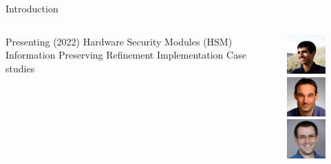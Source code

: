 \placelogofalse
\begin{frame}{Introduction}
\begin{columns}
\centering
\begin{outline}
  \1 Presenting \cite{Athalye2022Verifying} (2022)
  \1 Hardware Security Modules (HSM)
  \1 Information Preserving Refinement
  \1 Implementation
  \1 Case studies
\end{outline}

\begin{center}
\centering
{}

\includegraphics[width=1.5cm]{author_athalye.jpg} 
\includegraphics[width=1.5cm]{author_kaashoek.jpg} 
\includegraphics[width=1.5cm]{author_zeldovich.jpg} 

\end{center}
\end{columns}
\end{frame}
\placelogotrue


